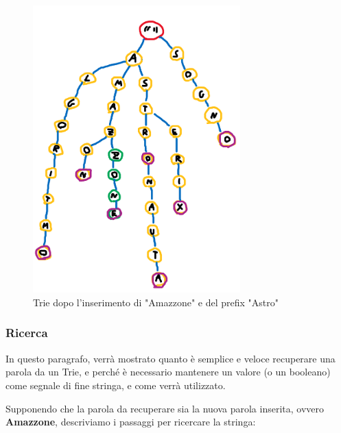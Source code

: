 \documentclass[a4paper, 12pt]{article}
\begin{document}
\begin{figure}[ht!]
    \centering
    \includegraphics[width=8cm]{Images/trie dopo inserimento.png}
    \caption{Trie dopo l'inserimento di "Amazzone" e del prefix "Astro"}
    \label{fig:afterinsert}
\end{figure}

\clearpage

\subsubsection{Ricerca}
In questo paragrafo, verrà mostrato quanto è semplice e veloce recuperare una parola da un Trie, e perché è necessario mantenere un valore (o un booleano) come segnale di fine stringa, e come verrà utilizzato.

Supponendo che la parola da recuperare sia la nuova parola inserita, ovvero \textbf{Amazzone}, descriviamo i passaggi per ricercare la stringa:
\end{document}
